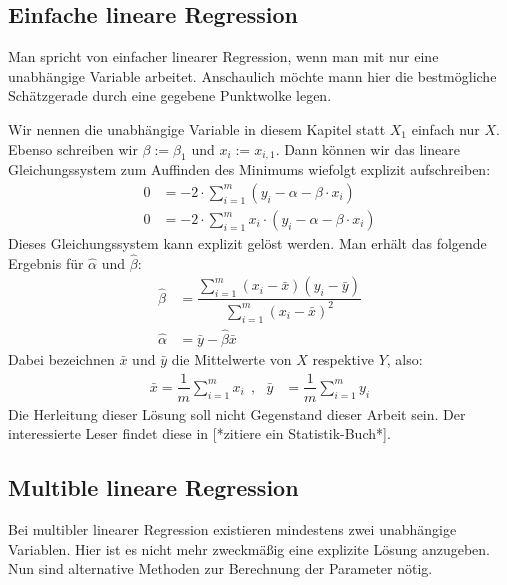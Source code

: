 \subsection{Einfache lineare Regression}
\label{subsection:2:1:1}

Man spricht von einfacher linearer Regression, wenn man mit nur eine unabhängige Variable arbeitet. Anschaulich möchte mann hier die bestmögliche Schätzgerade durch eine gegebene Punktwolke legen.

Wir nennen die unabhängige Variable in diesem Kapitel statt $X_1$ einfach nur $X$. Ebenso schreiben wir $\beta := \beta_1$ und $x_i := x_{i, 1}$. Dann können wir das lineare Gleichungssystem zum Auffinden des Minimums wiefolgt explizit aufschreiben:
\begin{align*}
    0 &= - 2 \cdot \sum_{i=1}^m (y_i - \alpha - \beta \cdot x_i)\\
    0 &= - 2 \cdot \sum_{i=1}^m x_i \cdot (y_i - \alpha - \beta \cdot x_i)
\end{align*}
Dieses Gleichungssystem kann explizit gelöst werden. Man erhält das folgende Ergebnis für $\hat\alpha$ und $\hat\beta$:
\begin{align*}
    \hat\beta &= \dfrac{\sum\limits_{i=1}^m (x_i - \bar x)(y_i - \bar y)}{\sum\limits_{i=1}^m (x_i - \bar x)^2}\\
    \hat\alpha &= \bar y - \hat\beta \bar x
\end{align*}
Dabei bezeichnen $\bar x$ und $\bar y$ die Mittelwerte von $X$ respektive $Y$, also:
\begin{align*}
    \bar x = \dfrac{1}{m} \sum_{i=1}^m x_i ~~,~~~ \bar y &= \dfrac{1}{m} \sum_{i=1}^m y_i
\end{align*}
Die Herleitung dieser Lösung soll nicht Gegenstand dieser Arbeit sein. Der interessierte Leser findet diese in [*zitiere ein Statistik-Buch*].

\subsection{Multible lineare Regression}
\label{subsection:2:1:2}

Bei multibler linearer Regression existieren mindestens zwei unabhängige Variablen. Hier ist es nicht mehr zweckmäßig eine explizite Lösung anzugeben. Nun sind alternative Methoden zur Berechnung der Parameter nötig.

